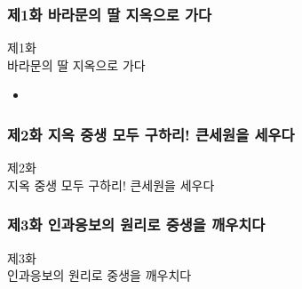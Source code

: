 \documentclass[aspectratio=1610,12pt,xcolor=pdftex,dvipsnames,table,handout]{beamer}
\begin{document}
		\begin{frame} [t,plain]
		\frametitle{제1화  바라문의 딸 지옥으로 가다 }
			\begin{block} { 제1화 \\ 바라문의 딸 지옥으로 가다 }
			\setlength{\leftmargini}{2em}			
			\begin{itemize}
				\item 
			\end{itemize}
			\end{block}						
								
		\end{frame}						


		\begin{frame} [t,plain]
		\frametitle{ 제2화 지옥 중생 모두 구하리! 큰세원을 세우다 }
			\begin{block} { 제2화 \\ 지옥 중생 모두 구하리!  큰세원을 세우다 }
			\end{block}						
								
		\end{frame}		

		\begin{frame} [t,plain]
		\frametitle{ 제3화 인과응보의 원리로 중생을 깨우치다 }
			\begin{block} { 제3화 \\ 인과응보의 원리로 중생을 깨우치다 }
			\end{block}						
								
		\end{frame}		
				
%
\end{document}

